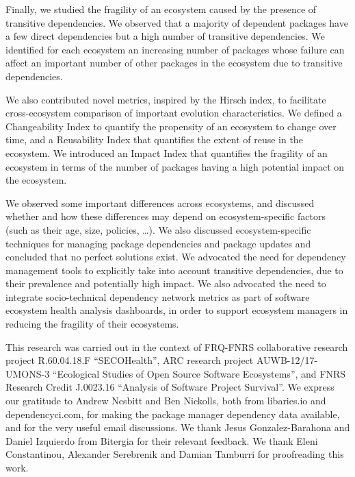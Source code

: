 \documentclass[smallextended]{svjour3}       %
\begin{document}
\noindent Finally, we studied the fragility of an ecosystem caused by the presence of transitive dependencies. We observed that a majority of dependent packages have a few direct dependencies but a high number of transitive dependencies. We identified for each ecosystem an increasing number of packages whose failure can affect an important number of other packages in the ecosystem due to transitive dependencies. 

We also contributed novel metrics, inspired by the Hirsch index, to facilitate cross-ecosystem comparison of important evolution characteristics. We defined a Changeability Index to quantify the propensity of an ecosystem to change over time, and a Reusability Index that quantifies the extent of reuse in the ecosystem. We introduced an Impact Index that quantifies the fragility of an ecosystem in terms of the number of packages having a high potential impact on the ecosystem.

We observed some important differences across ecosystems, and discussed whether and how these differences may depend on ecosystem-specific factors (such as their age, size, policies, \ldots). 
We also discussed ecosystem-specific techniques for managing package dependencies and package updates and concluded that no perfect solutions exist. We advocated the need for dependency management tools to explicitly take into account transitive dependencies, due to their prevalence and potentially high impact. 
We also advocated the need to integrate socio-technical dependency network metrics as part of software ecosystem health analysis dashboards, in order to support ecosystem managers in reducing the fragility of their ecosystems. 

\begin{acknowledgements}
This research was carried out in the context of FRQ-FNRS collaborative research project R.60.04.18.F ``SECOHealth'', ARC research project AUWB-12/17-UMONS-3 ``Ecological Studies of Open Source Software Ecosystems'', and FNRS Research Credit J.0023.16 ``Analysis of Software Project Survival''. 
We express our gratitude to Andrew Nesbitt and Ben Nickolls, both from \textsf{libaries.io} and \textsf{dependencyci.com}, for making the package manager dependency data available, and for the very useful email discussions. We thank Jesus Gonzalez-Barahona and Daniel Izquierdo from Bitergia for their relevant feedback.
We thank Eleni Constantinou, Alexander Serebrenik and Damian Tamburri for proofreading this work. 
\end{acknowledgements}
\end{document}
